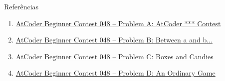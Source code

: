 \begin{frame}[fragile]{Referências}

    \begin{enumerate}
        \item \href{https://atcoder.jp/contests/abc046/tasks/abc048_a}{AtCoder Beginner Contest 
            048 -- Problem A: AtCoder *** Contest}

        \item \href{https://atcoder.jp/contests/abc046/tasks/abc048_b}{AtCoder Beginner Contest 
            048 -- Problem B: Between a and b...}

        \item \href{https://atcoder.jp/contests/abc046/tasks/arc064_a}{AtCoder Beginner Contest
            048 -- Problem C: Boxes and Candies}

        \item \href{https://atcoder.jp/contests/abc046/tasks/arc064_b}{AtCoder Beginner Contest
            048 -- Problem D: An Ordinary Game}
    \end{enumerate}

\end{frame}
